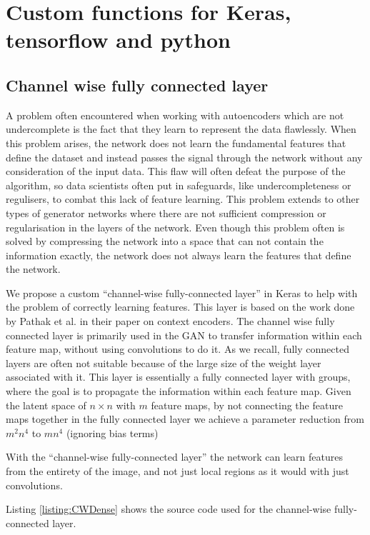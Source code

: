     
\section{Custom functions for Keras, tensorflow and python}
\subsection{Channel wise fully connected layer}
A problem often encountered when working with autoencoders which are not undercomplete is the fact that they learn to represent the data flawlessly. \cite{OvercompleteAE} 
When this problem arises, the network does not learn the fundamental features that define the dataset and instead passes the signal through the network without any consideration of the input data.
This flaw will often defeat the purpose of the algorithm, so data scientists often put in safeguards, like undercompleteness or regulisers, to combat this lack of feature learning. 
This problem extends to other types of generator networks where there are not sufficient compression or regularisation in the layers of the network.
Even though this problem often is solved by compressing the network into a space that can not contain the information exactly, the network does not always learn the features that define the network. 

We propose a custom ``channel-wise fully-connected layer'' in Keras to help with the problem of correctly learning features. This layer is based on the work done by Pathak et al. in their paper on context encoders\cite{Pathak_2016}.
The channel wise fully connected layer is primarily used in the GAN to transfer information within each feature map, without using convolutions to do it. As we recall, fully connected layers are often not suitable because of the large size of the weight layer associated with it. This layer is essentially a fully connected layer with groups, where the goal is to propagate the information within each feature map.
Given the latent space of $n \times n$ with $m$ feature maps, by not connecting the feature maps together in the fully connected layer we achieve a parameter reduction from $m^2n^4$ to $mn^4$ (ignoring bias terms) \cite{Pathak_2016}

With the ``channel-wise fully-connected layer'' the network can learn features from the entirety of the image, and not just local regions as it would with just convolutions. 

Listing \ref{listing:CWDense} shows the source code used for the channel-wise fully-connected layer.

